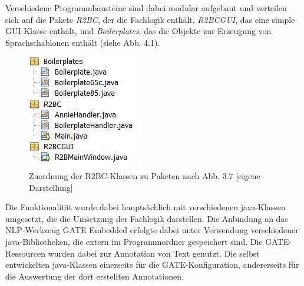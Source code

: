 \documentclass[12pt]{report}
\begin{document}
Verschiedene Programmbausteine sind dabei modular aufgebaut und verteilen sich auf die Pakete \textit{R2BC}, der die Fachlogik enthält, \textit{R2BCGUI}, das eine simple GUI-Klasse enthält, und \textit{Boilerplates}, das die Objekte zur Erzeugung von Sprachschablonen enthält (siehe Abb. 4.1).

\begin{figure}[h!]
\begin{center}
\includegraphics[scale=1.0]{Bilder/R2BC-Pakete.png}
\caption{Zuordnung der R2BC-Klassen zu Paketen nach Abb. 3.7 [eigene Darstellung]}
\end{center}
\end{figure}

Die Funktionalität wurde dabei hauptsächlich mit verschiedenen java-Klassen umgesetzt, die die Umsetzung der Fachlogik darstellen. Die Anbindung an das NLP-Werkzeug GATE Embedded erfolgte dabei unter Verwendung verschiedener java-Bibliotheken, die extern im Programmordner gespeichert sind. Die GATE-Ressourcen wurden dabei zur Annotation von Text genutzt. Die selbst entwickelten java-Klassen einerseits für die GATE-Konfiguration, andererseits für die Auswertung der dort erstellten Annotationen. 
\end{document}
